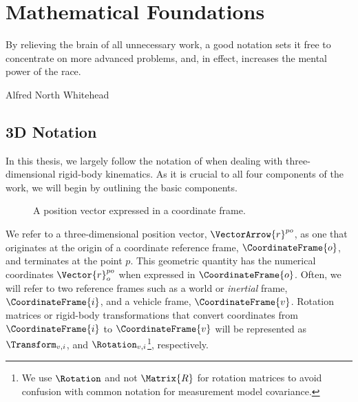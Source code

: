 \chapter{Mathematical Foundations}
\label{ch:math}
\epigraph{By relieving the brain of all unnecessary work, a good notation sets it free to concentrate on more advanced problems, and, in effect, increases the mental power of the race.}{Alfred North Whitehead}
  \section{3D Notation}

In this thesis, we largely follow the notation of \cite{Barfoot2017-ri} when dealing with three-dimensional rigid-body kinematics. As it is crucial to all four components of the work, we will begin by outlining the basic components.

\begin{figure}[h!]
\center
{}
%
%
\caption{A position vector expressed in a coordinate frame.}
\end{figure}

We refer to a three-dimensional position vector, $\VectorArrow{r}^{po}$, as one that originates at the origin of a coordinate reference frame, $\CoordinateFrame{o}$, and terminates at the point $p$. This geometric quantity has the numerical coordinates $\Vector{r}^{po}_o$ when expressed in $\CoordinateFrame{o}$. Often, we will refer to two reference frames such as a world or \textit{inertial} frame,  $\CoordinateFrame{i}$, and a vehicle frame, $\CoordinateFrame{v}$. Rotation matrices or rigid-body transformations that convert coordinates from $\CoordinateFrame{i}$ to $\CoordinateFrame{v}$ will be represented as $\Transform_{v,i}$, and $\Rotation_{v,i}$\footnote{We use $\Rotation$ and not $\Matrix{R}$ for rotation matrices to avoid confusion with common notation for measurement model covariance.}, respectively. 


